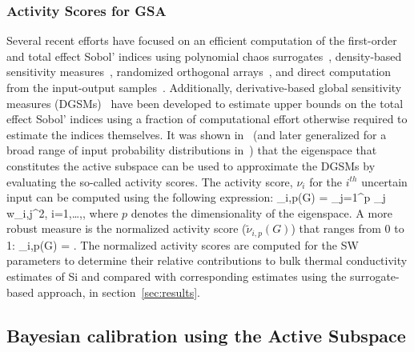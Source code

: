 \subsubsection{Activity Scores for GSA}
\label{subsub:gsa_as}
Several recent efforts have
focused on an efficient computation of the first-order and total effect Sobol' indices
using polynomial chaos surrogates~\cite{Sudret:2008}, density-based sensitivity measures~\cite{Plischke:2013},
randomized orthogonal arrays~\cite{Tissot:2015}, and direct computation from 
the input-output 
 samples~\cite{Li:2016}. Additionally,
derivative-based global sensitivity measures (DGSMs)~\cite{Sobol:2009, Lamboni:2013}
have been developed to estimate upper bounds on the total effect Sobol' indices using a fraction of computational effort
otherwise required to estimate the indices themselves. It was shown 
in~\cite{Diaz:2016,Constantine:2017} (and later generalized for a broad range of input probability distributions 
in~\cite{Vohra:2018c}) that the eigenspace that constitutes the active subspace can be used to
approximate the DGSMs by evaluating the so-called activity scores. The activity score, $\nu_i$ for the 
$i^{th}$ uncertain input can be computed using the following expression:
%
\be
\nu_{i,p}(G) = \sum\limits_{j=1}^{p} \lambda_j w_{i,j}^2, i=1,\ldots,\Nt,
\label{eq:ac}
\ee
%
where $p$ denotes the dimensionality of the eigenspace. 
A more robust measure is the normalized activity score ($\tilde{\nu}_{i,p}(G)$) that ranges from 0 to 1:
%
\be
\tilde{\nu}_{i,p}(G) = .
\label{eq:nac}
\ee
%
The normalized activity scores are computed for the SW parameters to determine their relative contributions
to bulk thermal conductivity estimates of Si and compared with corresponding estimates using the surrogate-based
approach, in section~\ref{sec:results}. 

\subsection{Bayesian calibration using the Active Subspace}
\label{sub:ba_method}

